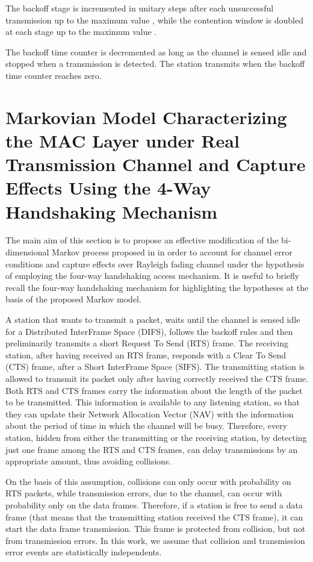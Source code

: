 \documentclass[10pt,onecolumn,a4paper]{IEEEtran}
\begin{document}
The backoff stage  is incremented in unitary steps after each
unsuccessful transmission up to the maximum value , while the
contention window is doubled at each stage up to the maximum value
.

The backoff time counter is decremented as long as the channel is
sensed idle and stopped when a transmission is detected. The
station transmits when the backoff time counter reaches zero.
\section{Markovian Model Characterizing the MAC Layer under Real
Transmission Channel and Capture Effects Using the 4-Way
Handshaking Mechanism}
The main aim of this section is to propose an effective
modification of the bi-dimensional Markov process proposed in
\cite{Bianchi} in order to account for channel error conditions
and capture effects over Rayleigh fading channel under the
hypothesis of employing the four-way handshaking access mechanism.
It is useful to briefly recall the four-way handshaking mechanism
for highlighting the hypotheses at the basis of the proposed
Markov model.

A station that wants to transmit a packet, waits until the channel
is sensed idle for a Distributed InterFrame Space (DIFS), follows
the backoff rules and then preliminarily transmits a short Request
To Send (RTS) frame. The receiving station, after having received
an RTS frame, responds with a Clear To Send (CTS) frame, after a
Short InterFrame Space (SIFS). The transmitting station is allowed
to transmit its packet only after having correctly received the
CTS frame. Both RTS and CTS frames carry the information about the
length of the packet to be transmitted. This information is
available to any listening station, so that they can update their
Network Allocation Vector (NAV) with the information about the
period of time in which the channel will be busy. Therefore, every
station, hidden from either the transmitting or the receiving
station, by detecting just one frame among the RTS and CTS frames,
can delay transmissions by an appropriate amount, thus avoiding
collisions.

On the basis of this assumption, collisions can only occur with
probability  on RTS packets, while transmission errors,
due to the channel, can occur with probability  only on the
data frames. Therefore, if a station is free to send a data frame
(that means that the transmitting station received the CTS frame),
it can start the data frame transmission. This frame is protected
from collision, but not from transmission errors. In this work, we
assume that collision and transmission error events are
statistically independents.
\end{document}
